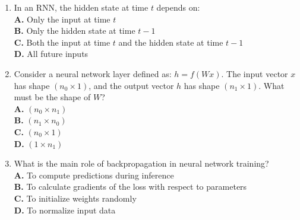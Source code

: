 \documentclass[11pt]{article}
\begin{document}
\begin{enumerate}[label=Q\arabic*., leftmargin=*]
\item In an RNN, the hidden state at time $t$ depends on:\\[0.25em]
\textbf{A.} Only the input at time $t$\\
\textbf{B.} Only the hidden state at time $t-1$\\
\textbf{C.} Both the input at time $t$ and the hidden state at time $t-1$\\
\textbf{D.} All future inputs

\item Consider a neural network layer defined as: $h = f(Wx)$. The input vector $x$ has shape $(n_0 \times 1)$, and the output vector $h$ has shape $(n_1 \times 1)$. What must be the shape of $W$?\\[0.25em]
\textbf{A.} $(n_0 \times n_1)$\\
\textbf{B.} $(n_1 \times n_0)$\\
\textbf{C.} $(n_0 \times 1)$\\
\textbf{D.} $(1 \times n_1)$

\item What is the main role of backpropagation in neural network training?\\[0.25em]
\textbf{A.} To compute predictions during inference\\
\textbf{B.} To calculate gradients of the loss with respect to parameters\\
\textbf{C.} To initialize weights randomly\\
\textbf{D.} To normalize input data

\end{enumerate}
\end{document}
